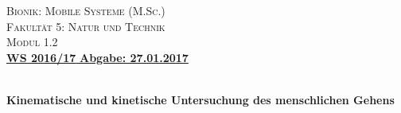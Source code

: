 \begin{titlepage}
\begin{minipage}[c]{9cm}
\vspace{0pt}
\textsc{\large Bionik: Mobile Systeme (M.Sc.)}\\
\textsc{Fakultät 5: Natur und Technik}\\
\textsc{\small Modul 1.2}\\
[0.5cm]
\underline{\large \textbf{WS 2016/17}\hspace{9cm} \textbf{Abgabe: 27.01.2017}}\\
\end{minipage}
\begin{minipage}[c]{6cm}
\vspace{0pt}
\vspace{1cm}
\end{minipage}

\begin{center}
\vspace{5cm}


\\
[1.5cm]

\huge \bfseries Kinematische und kinetische Untersuchung des menschlichen Gehens\\
[0.4cm]

\vfill

\end{center}
\normalsize
{}\\
{}\\
{}\\
\end{titlepage}